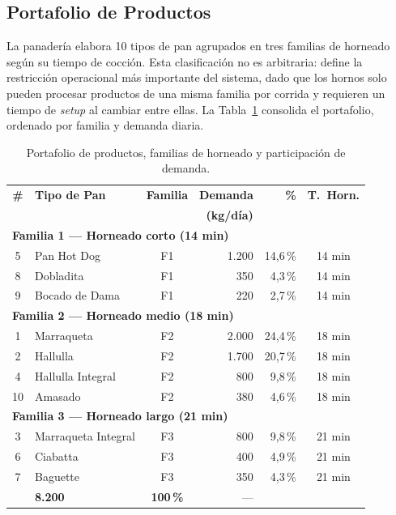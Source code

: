\documentclass[10pt, a4paper]{article}
\begin{document}
\subsection{Portafolio de Productos}

La panader\'ia elabora 10 tipos de pan agrupados en tres familias de horneado
seg\'un su tiempo de cocci\'on. Esta clasificaci\'on no es arbitraria: define
la restricci\'on operacional m\'as importante del sistema, dado que los hornos
solo pueden procesar productos de una misma familia por corrida y requieren un
tiempo de \textit{setup} al cambiar entre ellas. La Tabla~\ref{tab:productos}
consolida el portafolio, ordenado por familia y demanda diaria.

\begin{table}[H]
\centering
\caption{Portafolio de productos, familias de horneado y participaci\'on de demanda.}
\label{tab:productos}
\renewcommand{\arraystretch}{1.30}
\setlength{\tabcolsep}{6pt}
\begin{tabular}{c l c r r c}
\toprule
\rowcolor{azulClaro}
\textbf{\#} & \textbf{Tipo de Pan} & \textbf{Familia} & \textbf{Demanda} & \textbf{\%} & \textbf{T.\ Horn.} \\
\rowcolor{azulClaro}
            &                     &                  & \textbf{(kg/d\'ia)} &             &                       \\
\midrule
\multicolumn{6}{l}{\cellcolor{azulUDD!10}\textbf{Familia 1 --- Horneado corto (14 min)}} \\
5 & Pan Hot Dog       & F1 & 1.200 & 14{,}6\,\% & 14 min \\
\rowcolor{grisClaro}
8 & Dobladita         & F1 & 350   & 4{,}3\,\%  & 14 min \\
9 & Bocado de Dama    & F1 & 220   & 2{,}7\,\%  & 14 min \\
\midrule
\multicolumn{6}{l}{\cellcolor{azulUDD!10}\textbf{Familia 2 --- Horneado medio (18 min)}} \\
\rowcolor{grisClaro}
1  & Marraqueta         & F2 & 2.000 & 24{,}4\,\% & 18 min \\
2  & Hallulla           & F2 & 1.700 & 20{,}7\,\% & 18 min \\
\rowcolor{grisClaro}
4  & Hallulla Integral  & F2 & 800   & 9{,}8\,\%  & 18 min \\
10 & Amasado            & F2 & 380   & 4{,}6\,\%  & 18 min \\
\midrule
\multicolumn{6}{l}{\cellcolor{azulUDD!10}\textbf{Familia 3 --- Horneado largo (21 min)}} \\
\rowcolor{grisClaro}
3 & Marraqueta Integral & F3 & 800   & 9{,}8\,\%  & 21 min \\
6 & Ciabatta            & F3 & 400   & 4{,}9\,\%  & 21 min \\
\rowcolor{grisClaro}
7 & Baguette            & F3 & 350   & 4{,}3\,\%  & 21 min \\
\midrule
\rowcolor{azulClaro}
\multicolumn{3}{r}{\textbf{TOTAL}} & \textbf{8.200} & \textbf{100\,\%} & --- \\
\bottomrule
\end{tabular}
\end{table}
\end{document}

